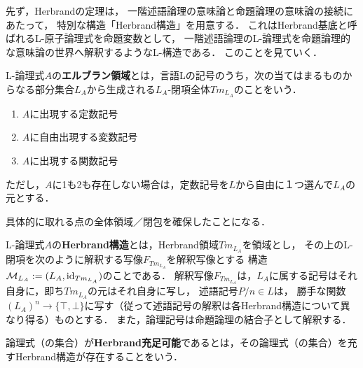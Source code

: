 \documentclass[uplatex,dvipdfmx]{jsarticle}
\begin{document}
先ず，Herbrandの定理は，
一階述語論理の意味論と命題論理の意味論の接続にあたって，
特別な構造「Herbrand構造」を用意する．
これはHerbrand基底と呼ばれるL-原子論理式を命題変数として，
一階述語論理のL-論理式を命題論理的な意味論の世界へ解釈するようなL-構造である．
このことを見ていく．

\begin{definition}
    L-論理式$A$の\textbf{エルブラン領域}とは，言語Lの記号のうち，次の当てはまるものからなる部分集合$L_A$から生成される$L_A$-閉項全体$Tm_{L_A}$のことをいう．
    \begin{enumerate}
        \item $A$に出現する定数記号
        \item $A$に自由出現する変数記号
        \item $A$に出現する関数記号
    \end{enumerate}
    ただし，$A$に1も2も存在しない場合は，定数記号を$L$から自由に１つ選んで$L_A$の元とする．
\end{definition}
\begin{remark}
    具体的に取れる点の全体領域／閉包を確保したことになる．
\end{remark}

\begin{definition}
    L-論理式$A$の\textbf{Herbrand構造}とは，Herbrand領域$Tm_{L_A}$を領域とし，
    その上のL-閉項を次のように解釈する写像$F_{Tm_{L_A}}$を解釈写像とする
    構造$\mathcal{M}_{L_A}:=(L_A,\mathrm{id}_{Tm_{L_A}})$のことである．
    解釈写像$F_{Tm_{L_A}}$は，$L_A$に属する記号はそれ自身に，即ち$Tm_{L_A}$の元はそれ自身に写し，
    述語記号$P/n\in L$は，
    勝手な関数$(L_A)^n\to\{\top,\bot\}$に写す（従って述語記号の解釈は各Herbrand構造について異なり得る）ものとする．
    また，論理記号は命題論理の結合子として解釈する．
\end{definition}
\begin{definition}
    論理式（の集合）が\textbf{Herbrand充足可能}であるとは，その論理式（の集合）を充すHerbrand構造が存在することをいう．
\end{definition}
\end{document}

